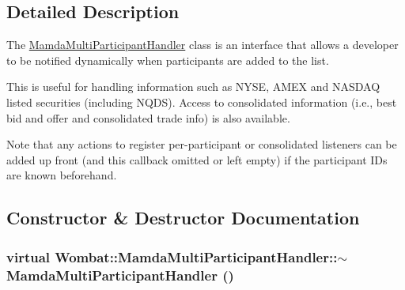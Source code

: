 \subsection{Detailed Description}
The \hyperlink{classWombat_1_1MamdaMultiParticipantHandler}{Mamda\-Multi\-Participant\-Handler} class is an interface that allows a developer to be notified dynamically when participants are added to the list. 

This is useful for handling information such as NYSE, AMEX and NASDAQ listed securities (including NQDS). Access to consolidated information (i.e., best bid and offer and consolidated trade info) is also available.

Note that any actions to register per-participant or consolidated listeners can be added up front (and this callback omitted or left empty) if the participant IDs are known beforehand. 



\subsection{Constructor \& Destructor Documentation}
\hypertarget{classWombat_1_1MamdaMultiParticipantHandler_1befa1fe7f6b06f14aa20c9fddecbe41}{
\subsubsection[$\sim$MamdaMultiParticipantHandler]{\setlength{\rightskip}{0pt plus 5cm}virtual Wombat::Mamda\-Multi\-Participant\-Handler::$\sim$Mamda\-Multi\-Participant\-Handler ()}}
\label{classWombat_1_1MamdaMultiParticipantHandler_1befa1fe7f6b06f14aa20c9fddecbe41}




